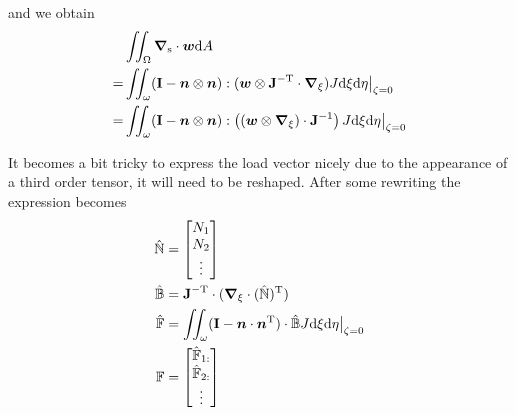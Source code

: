 \documentclass[a4paper,11pt]{article}
\newcommand{\ta}[1]{\text{\boldmath $#1$}} %
\newcommand{\ts}[1]{\text{\boldmath $\mathrm{#1}$}} %
\newcommand{\uv}[1]{\mathbb{#1}}
\newcommand{\um}[1]{\mathbb{#1}}
\newcommand{\dif}[1]{\mathrm{d}#1}
\newcommand{\diff}{\ta{\nabla}}
\newcommand{\norm}[1]{\left\lVert{#1}\right\rVert}
\newcommand{\T}{\mathrm{T}}
\newcommand{\surf}{\mathrm{s}}
\begin{document}
and we obtain
\begin{align}
 &\iint_\Omega\diff_\surf\cdot\ta w\dif A\\
=&\iint_\omega(\ts I-\ta n\otimes\ta n):(\ta w\otimes \ts J^{-\T}\cdot\diff_\xi)J\dif\xi\dif\eta\big|_{\zeta=0}\\
=&\iint_\omega(\ts I-\ta n\otimes\ta n):\left((\ta w\otimes\diff_\xi) \cdot\ts J^{-1}\right)J\dif\xi\dif\eta\big|_{\zeta=0}
\end{align}


It becomes a bit tricky to express the load vector nicely due to the appearance of a third order tensor, it will need to be reshaped.
After some rewriting the expression becomes
\begin{align}
 \hat{\uv N} &= \begin{bmatrix} N_1\\ N_2\\ \vdots\end{bmatrix}\\
 \hat{\um B} &= \ts J^{-\T}\cdot(\diff_\xi\cdot(\hat{\uv N})^\T)\\
 \hat{\um F} &= \iint_\omega(\ts I-\ta n \cdot \ta n^\T)\cdot \hat{\um B} J\dif\xi\dif\eta\big|_{\zeta=0}\\
 \uv F &= \begin{bmatrix}\hat{\uv F}_{1:}\\\hat{\uv F}_{2:}\\\vdots\end{bmatrix}
\end{align}
\end{document}
